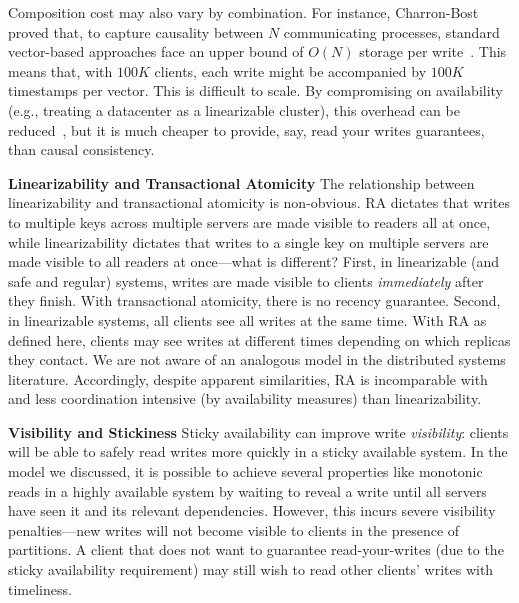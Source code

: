 Composition cost may also vary by combination. For instance, Charron-Bost
 proved that, to capture causality between $N$ communicating
processes, standard vector-based approaches face an upper bound of
$O(N)$ storage per write~\cite{charron-bost}. This means that, with
$100K$ clients, each write might be accompanied by $100K$ timestamps
per vector. This is difficult to scale. By compromising on
availability (e.g., treating a datacenter as a linearizable cluster),
this overhead can be reduced~\cite{eiger}, but it is much
cheaper to provide, say, read your writes guarantees, than causal
consistency.

\vspace{.5em}\noindent\textbf{Linearizability and Transactional
  Atomicity} The relationship between linearizability and
transactional atomicity is non-obvious. RA dictates that writes to
multiple keys across multiple servers are made visible to readers all
at once, while linearizability dictates that writes to a single key on
multiple servers are made visible to all readers at once---what is
different? First, in linearizable (and safe and regular) systems,
writes are made visible to clients \textit{immediately} after they
finish. With transactional atomicity, there is no recency
guarantee. Second, in linearizable systems, all clients see all writes
at the same time. With RA as defined here, clients may see writes at
different times depending on which replicas they contact. We are not
aware of an analogous model in the distributed systems
literature. Accordingly, despite apparent similarities, RA is
incomparable with and less coordination intensive (by availability
measures) than linearizability.

\vspace{.5em}\noindent\textbf{Visibility and Stickiness} Sticky
availability can improve write \textit{visibility}: clients will be
able to safely read writes more quickly in a sticky available
system. In the model we discussed, it is possible to achieve several
properties like monotonic reads in a highly available system by
waiting to reveal a write until all servers have seen it and its
relevant dependencies. However, this incurs severe visibility
penalties---new writes will not become visible to clients in the
presence of partitions. A client that does not want to guarantee
read-your-writes (due to the sticky availability requirement) may
still wish to read other clients' writes with timeliness.
